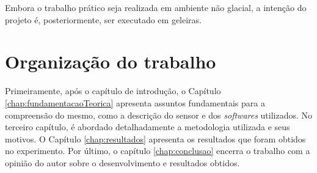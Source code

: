Embora o trabalho prático seja realizada em ambiente não glacial, a intenção do projeto é, posteriormente, ser executado em geleiras.

\section{Organização do trabalho}
\label{sec:organizacaoTrabalho}

Primeiramente, após o capítulo de introdução, o Capítulo \ref{chap:fundamentacaoTeorica} apresenta assuntos fundamentais para a compreensão do mesmo, como a descrição do sensor e dos \textit{softwares} utilizados. No terceiro capítulo, é abordado detalhadamente a metodologia utilizada e seus motivos. O Capítulo \ref{chap:resultados} apresenta os resultados que foram obtidos no experimento. 
Por último, o capítulo \ref{chap:conclusao} encerra o trabalho com a opinião do autor sobre o desenvolvimento e resultados obtidos.